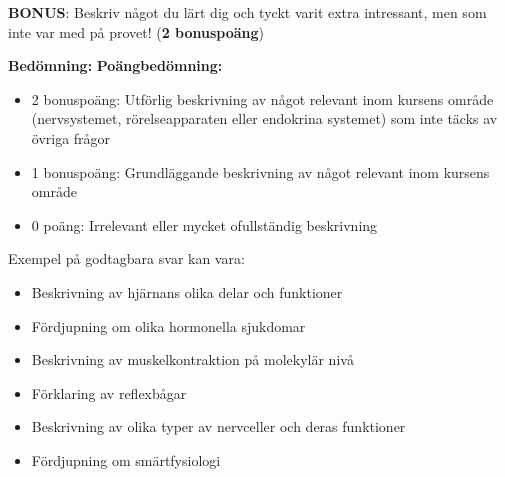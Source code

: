 \documentclass{exam}
\newenvironment{answer}
  {\begin{framed}\color{blue}\textbf{Bedömning:} }
  {\end{framed}}
\begin{document}
\begin{questions}
\question \textbf{BONUS}: Beskriv något du lärt dig och tyckt varit extra intressant, men som inte var med på provet! (\textbf{2 bonuspoäng})

\begin{answer}
\textbf{Poängbedömning:}
\begin{itemize}
  \item 2 bonuspoäng: Utförlig beskrivning av något relevant inom kursens område (nervsystemet, rörelseapparaten eller endokrina systemet) som inte täcks av övriga frågor
  \item 1 bonuspoäng: Grundläggande beskrivning av något relevant inom kursens område
  \item 0 poäng: Irrelevant eller mycket ofullständig beskrivning
\end{itemize}

Exempel på godtagbara svar kan vara:
\begin{itemize}
  \item Beskrivning av hjärnans olika delar och funktioner
  \item Fördjupning om olika hormonella sjukdomar
  \item Beskrivning av muskelkontraktion på molekylär nivå
  \item Förklaring av reflexbågar
  \item Beskrivning av olika typer av nervceller och deras funktioner
  \item Fördjupning om smärtfysiologi
\end{itemize}
\end{answer}

\end{questions}
\end{document}
